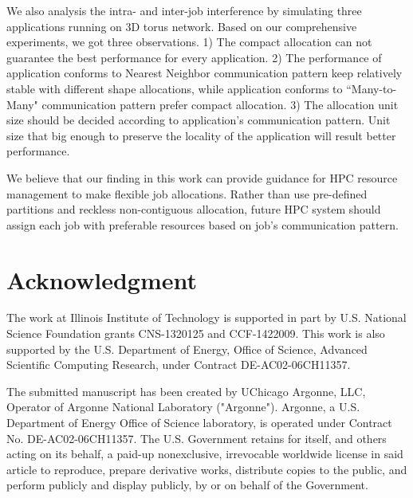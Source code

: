\documentclass[conference]{IEEEtran}
\begin{document}
We also analysis the intra- and inter-job interference by simulating three applications running on 3D torus network. Based on our comprehensive experiments, we got three observations. 1) The compact allocation can not guarantee the best performance for every application. 2) The performance of application conforms to Nearest Neighbor communication pattern keep relatively stable with different shape allocations, while application conforms to ``Many-to-Many" communication pattern prefer compact allocation. 3) The allocation unit size should be decided according to application's communication pattern. Unit size that big enough to preserve the locality of the application will result better performance. 

We believe that our finding in this work can provide guidance for HPC resource management to make flexible job allocations. Rather than use pre-defined partitions and reckless non-contiguous allocation, future HPC system should assign each job with preferable resources based on job's communication pattern. 

\section*{Acknowledgment}
\label{sec: ack}
The work at Illinois Institute of Technology is supported in part by U.S. National Science Foundation grants CNS-1320125 and CCF-1422009. This work is also supported by the U.S. Department of Energy, Office of Science, Advanced Scientific Computing Research, under Contract DE-AC02-06CH11357.


  


\vspace{5\baselineskip}
The submitted manuscript has been created by UChicago Argonne, LLC, Operator of Argonne National Laboratory ("Argonne").  Argonne, a U.S. Department of Energy Office of Science laboratory, is operated under Contract No. DE-AC02-06CH11357.  The U.S. Government retains for itself, and others acting on its behalf, a paid-up nonexclusive, irrevocable worldwide license in said article to reproduce, prepare derivative works, distribute copies to the public, and perform publicly and display publicly, by or on behalf of the Government.
\end{document}
